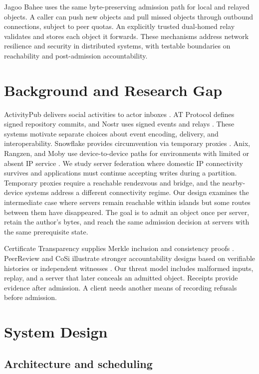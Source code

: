 \documentclass[conference,a4paper,10pt]{IEEEtran}
\begin{document}
Jagoo Bahee uses the same byte-preserving admission path for local and relayed objects. A caller can push new objects and pull missed objects through outbound connections, subject to peer quotas. An explicitly trusted dual-homed relay validates and stores each object it forwards. These mechanisms address network resilience and security in distributed systems, with testable boundaries on reachability and post-admission accountability.

\section{Background and Research Gap}

ActivityPub delivers social activities to actor inboxes \cite{activitypub}. AT Protocol defines signed repository commits, and Nostr uses signed events and relays \cite{atproto,nostr}. These systems motivate separate choices about event encoding, delivery, and interoperability. Snowflake provides circumvention via temporary proxies \cite{bocovich2024snowflake}. Anix, Rangzen, and Moby use device-to-device paths for environments with limited or absent IP service \cite{kamali2025anix,lerner2016rangzen,pradeep2022moby}. We study server federation where domestic IP connectivity survives and applications must continue accepting writes during a partition. Temporary proxies require a reachable rendezvous and bridge, and the nearby-device systems address a different connectivity regime. Our design examines the intermediate case where servers remain reachable within islands but some routes between them have disappeared. The goal is to admit an object once per server, retain the author's bytes, and reach the same admission decision at servers with the same prerequisite state.

Certificate Transparency supplies Merkle inclusion and consistency proofs \cite{rfc6962,rfc9162}. PeerReview and CoSi illustrate stronger accountability designs based on verifiable histories or independent witnesses \cite{haeberlen2007peerreview,syta2016cosi}. Our threat model includes malformed inputs, replay, and a server that later conceals an admitted object. Receipts provide evidence after admission. A client needs another means of recording refusals before admission.

\section{System Design}

\subsection{Architecture and scheduling}
\end{document}
